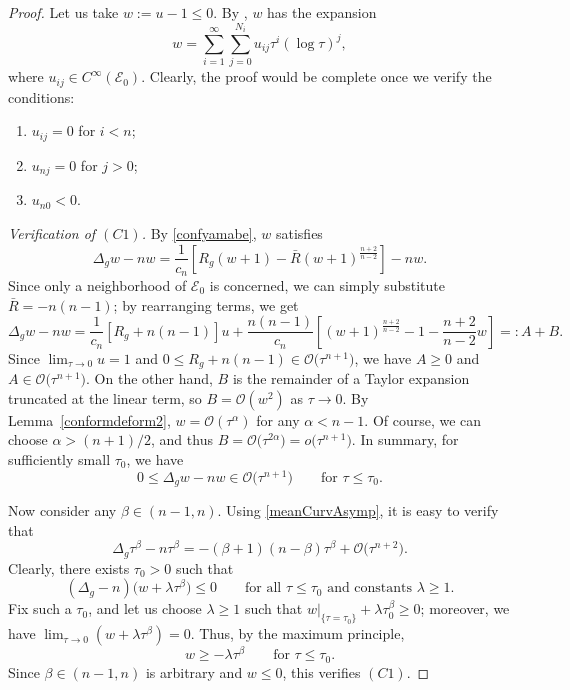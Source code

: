 \documentclass[10pt,a4paper]{amsart}
\numberwithin{equation}{section}
\def\Ecal{\mathcal{E}}
\def\Ocal{\mathcal{O}}
\begin{document}
\begin{proof} Let us take $w:=u- 1\leq 0$.
By \cite[Theorem 1.3]{ACF92}, $w$ has the expansion
 \begin{equation*}
     w=\sum\limits_{i=1}^{\infty}\sum\limits_{j=0}^{N_{i}}u_{ij}\tau^i(\log\tau)^j,
 \end{equation*}
where $u_{ij}\in C^{\infty}(\Ecal_0)$.
Clearly, the proof would be complete once we verify the conditions:
\begin{enumerate}\itemsep=0pt
    \item[$(C1)$] $u_{ij} =0$ for $i<n$;
    \item[$(C2)$] $u_{nj} =0$ for  $j>0$;
    \item[$(C3)$] $u_{n0} <0$.
\end{enumerate}

\emph{Verification of $(C1)$.}
By \eqref{confyamabe}, $w$ satisfies
\begin{equation*}
	\Delta_g w  - n w = \frac{1}{c_n} \left[R_g (w+1)  - \bar R (w+1)^{\frac{n+2}{n-2}}\right]
						- nw.
\end{equation*}
Since only a neighborhood of $\Ecal_0$ is
concerned, we can simply substitute $\bar R = -n(n-1)$; by rearranging terms,
we get
\begin{equation*}%
	\Delta_g w - nw = \frac{1}{c_n} [R_g+n(n-1)] u
			 + \frac{n(n-1)}{c_n} \left[(w+1)^{\frac{n+2}{n-2}} - 1 - \frac{n+2}{n-2}w\right] =: A+B.
\end{equation*}
Since $\lim_{\tau\rightarrow 0 } u = 1$ and
$0\le R_g+n(n-1) \in \Ocal\big(\tau^{n+1}\big)$, we have $A\ge 0$ and $A\in \Ocal\big(\tau^{n+1}\big)$.
On the other hand,
$B$ is the remainder of a Taylor expansion truncated at the linear term, so
$B = \Ocal(w^2)$ as $\tau\rightarrow 0$. By Lemma~\ref{conformdeform2}, $w = \Ocal(\tau^\alpha)$ for any $\alpha< n- 1$.
Of course, we can choose $\alpha > (n+1)/2$, and thus
$B = \Ocal\bigl(\tau^{2\alpha}\bigr) = o\bigl(\tau^{n+1}\bigr)$.
In summary, for sufficiently small $\tau_0$, we have
\begin{equation}\label{LapwminusNwEst}
	0\le  \Delta_g w - n w \in \Ocal\bigl(\tau^{n+1}\bigr)\qquad \mbox{for } \tau \le \tau_0.
\end{equation}

Now consider any $\beta \in (n-1, n)$. Using \eqref{meanCurvAsymp},
it is easy to verify that
\[
	\Delta_g \tau^\beta - n\tau^\beta = -(\beta + 1)(n - \beta) \tau^\beta
	+ \Ocal\bigl(\tau^{n+2}\bigr).
\]
Clearly, there exists $\tau_0>0$ such that
\begin{equation*}
(\Delta_g - n)\big(w + \lambda \tau^\beta\big) \le 0 \qquad \text{for all }
	\tau\le \tau_0 \text{ and constants } \lambda \ge 1.
\end{equation*}
Fix such a $\tau_0$, and let us choose $\lambda\ge 1$ such that
$w|_{\{\tau = \tau_0\}}+\lambda\tau_0^\beta \ge 0$; moreover,
we have $\lim_{\tau\rightarrow 0} (w+\lambda\tau^\beta) = 0$.
Thus, by the maximum principle,
\begin{equation*}
	w\ge -\lambda\tau^\beta\qquad \mbox{for }\tau\le \tau_0.
\end{equation*}
Since $\beta\in (n-1,n)$ is arbitrary and $w\le 0$, this verifies $(C1)$.


\end{proof}
\end{document}
